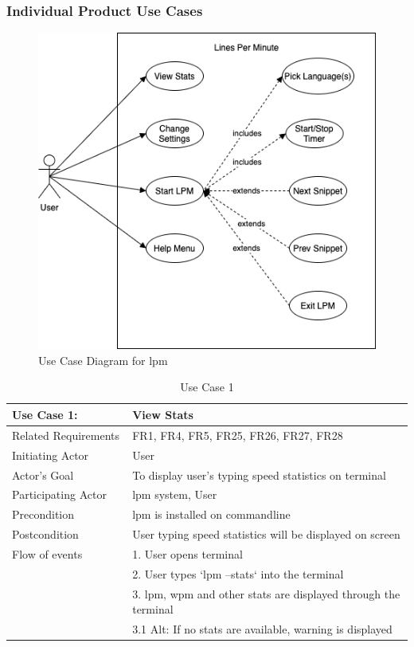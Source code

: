 \documentclass[12pt, titlepage]{article}
\begin{document}
\subsubsection{Individual Product Use Cases}
\begin{figure}[!htbp]
    \centering
    \includegraphics[scale=0.6]{usecase.png}
    \caption{Use Case Diagram for lpm}
    \label{fig:usecase}
\end{figure}

\begin{table}[!htpb]
    \centering
    \begin{tabular}{|p{0.3\linewidth}|p{0.7\linewidth}|}
        \hline
        \textbf{Use Case 1:} & \textbf{View Stats} \\
        \hline
        Related Requirements & FR1, FR4, FR5, FR25, FR26, FR27, FR28\\
        \hline
        Initiating Actor & User\\
        \hline
        Actor's Goal & To display user's typing speed statistics on terminal\\
        \hline
        Participating Actor & lpm system, User\\
        \hline
        Precondition & lpm is installed on commandline\\
        \hline
        Postcondition & User typing speed statistics will be displayed on screen\\
        \hline
        Flow of events & 1. User opens terminal \\
        & 2. User types `lpm --stats` into the terminal \\
        & 3. lpm, wpm and other stats are displayed through the terminal \\
        & 3.1 Alt: If no stats are available, warning is displayed \\
        \hline
    \end{tabular}
    \caption{Use Case 1}
    \label{tab:usecase1}
\end{table}
\end{document}
